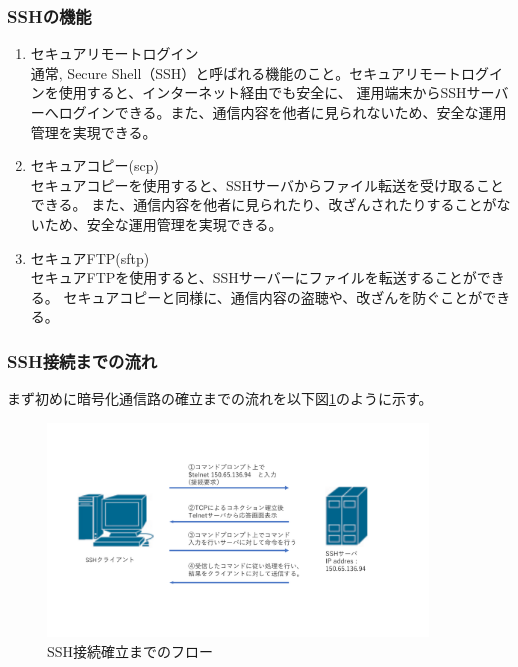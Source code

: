 \documentclass[12pt,a4paper,titlepage]{jsarticle}
\begin{document}
\subsubsection{SSHの機能}



\begin{enumerate}
    \item セキュアリモートログイン\mbox{}\\通常,
    Secure Shell（SSH）と呼ばれる機能のこと。セキュアリモートログインを使用すると、インターネット経由でも安全に、
    運用端末からSSHサーバーへログインできる。また、通信内容を他者に見られないため、安全な運用管理を実現できる。
    \item セキュアコピー(scp)\mbox{}\\セキュアコピーを使用すると、SSHサーバからファイル転送を受け取ることできる。
    また、通信内容を他者に見られたり、改ざんされたりすることがないため、安全な運用管理を実現できる。
    \item セキュアFTP(sftp)\mbox{}\\セキュアFTPを使用すると、SSHサーバーにファイルを転送することができる。
    セキュアコピーと同様に、通信内容の盗聴や、改ざんを防ぐことができる。
\end{enumerate}



\subsubsection{SSH接続までの流れ}

まず初めに暗号化通信路の確立までの流れを以下図\ref{SSH_flow}のように示す。
\begin{figure}[h]
    \centering
    \includegraphics[width=0.9\textwidth, page=5]{graphs/network_archtecture.pdf}
    \caption{SSH接続確立までのフロー}
    \label{SSH_flow}
\end{figure}
\end{document}
